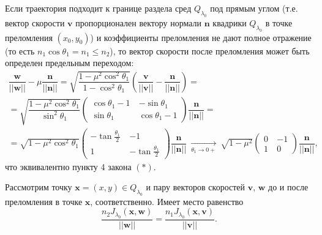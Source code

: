 \begin{statement}
Если траектория подходит к границе раздела сред $Q_{\lambda_0}$ под прямым углом (т.е. вектор скорости $\mathbf{v}$ пропорционален вектору нормали $\mathbf{n}$   квадрики $Q_{\lambda_0}$ в точке преломления $(x_0,y_0)$) и коэффициенты преломления не дают полное отражение (то есть $n_1 \cos \theta_1 = n_1 \leq n_2$), то вектор скорости после преломления может быть определен предельным переходом:
\begin{multline*}
\dfrac{\mathbf{w}}{||\mathbf{w}||} - \mu \dfrac{\mathbf{n}}{||\mathbf{n}||}=  \sqrt{\dfrac{1-\mu^2 \cos^2 \theta_1 }{1-\cos^2\theta_1}} \left( \dfrac{\mathbf{v}}{||\mathbf{v}||} - \dfrac{\mathbf{n}}{||\mathbf{n}||} \right) = \\
=  \sqrt{\dfrac{1-\mu^2 \cos^2 \theta_1 }{\sin^2\theta_1}}  \left(
    \begin{array}{cc}
    \cos \theta_1 - 1 \ & -\sin \theta_1 \\
    \sin \theta_1 \ & \cos \theta_1 - 1 
    \end{array}
\right) \dfrac{\mathbf{n}}{||\mathbf{n}||} = \\
=  \sqrt{1-\mu^2 \cos^2 \theta_1 }  \left(
    \begin{array}{cc}
    -\tan \frac{\theta_1}{2}  \ & -1 \\
    1 \ & -\tan \frac{\theta_1}{2}
    \end{array}
\right) \dfrac{\mathbf{n}}{||\mathbf{n}||} \ \xrightarrow[\theta_1 \to 0+]{} \ 
\sqrt{1-\mu^2}  \left(
    \begin{array}{cc}
    0  \ & -1 \\
    1  \ & 0
    \end{array}
\right) \dfrac{\mathbf{n}}{||\mathbf{n}||},
\end{multline*}
что эквивалентно пункту 4 закона $(\ast)$.
\end{statement}


\begin{statement}
Рассмотрим точку $\mathbf{x}=(x, y) \in Q_{\lambda_0}$ и пару векторов скоростей $\mathbf{v}$, $\mathbf{w}$ до и после преломления в точке $\mathbf{x}$, соответственно. 
Имеет место равенство
\begin{equation}
\dfrac{n_2 J_{\lambda_0}(\mathbf{x}, \mathbf{w})}{||\mathbf{w}||} = 
\dfrac{n_1 J_{\lambda_0}(\mathbf{x}, \mathbf{v})}{||\mathbf{v}||}.
\label{eq:sect3_eq7}
\end{equation}
\label{th:joachFraction}
\end{statement}

